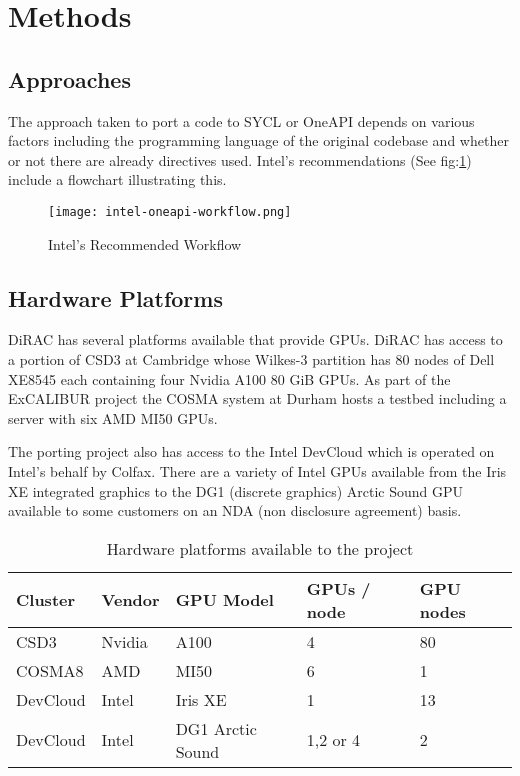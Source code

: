
\section{Methods}\label{sec:methods}
\subsection{Approaches}\label{sec:approaches}

The approach taken to port a code to SYCL or OneAPI\cite{intel_corp_oneapi_nodate} depends on various factors including the programming language of the original codebase and whether or not there are already directives used. Intel's recommendations (See fig:\ref{fig:intel-workflow}) include a flowchart illustrating this.

\begin{figure}[htb]
	\caption{Intel's Recommended Workflow}
	\texttt{[image: intel-oneapi-workflow.png]}
	\label{fig:intel-workflow} %
\end{figure}

\subsection{Hardware Platforms}

DiRAC has several platforms available that provide GPUs. DiRAC has access to a portion of CSD3 at Cambridge whose Wilkes-3 partition has 80 nodes of Dell XE8545 each containing four Nvidia A100 80 GiB GPUs. As part of the ExCALIBUR project the COSMA system at Durham hosts a testbed including a server with six AMD MI50 GPUs.

The porting project also has access to the Intel DevCloud which is operated on Intel's behalf by Colfax. There are a variety of Intel GPUs available from the Iris XE integrated graphics to the DG1 (discrete graphics) Arctic Sound GPU available to some customers on an NDA (non disclosure agreement) basis.

\begin{table}[htbp]
	\centering
	\begin{tabular}{lllll}
		Cluster  & Vendor & GPU Model        & GPUs / node & GPU nodes \\
		\hline  %
		CSD3     & Nvidia & A100             & 4           & 80        \\
		COSMA8   & AMD    & MI50             & 6           & 1         \\
		DevCloud & Intel  & Iris XE          & 1           & 13        \\
		DevCloud & Intel  & DG1 Arctic Sound & 1,2 or 4    & 2
	\end{tabular}
	\caption{Hardware platforms available to the project}
	\label{tab:GPUs} %
\end{table}

